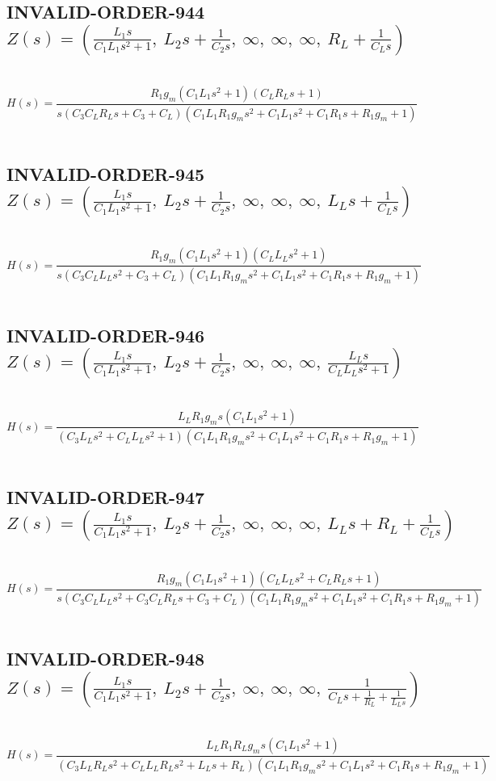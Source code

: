 \documentclass{article}
\begin{document}
\subsection{INVALID-ORDER-944 $Z(s) = \left( \frac{L_{1} s}{C_{1} L_{1} s^{2} + 1}, \  L_{2} s + \frac{1}{C_{2} s}, \  \infty, \  \infty, \  \infty, \  R_{L} + \frac{1}{C_{L} s}\right)$ } \ 
\textbf{\[H(s) = \frac{R_{1} g_{m} \left(C_{1} L_{1} s^{2} + 1\right) \left(C_{L} R_{L} s + 1\right)}{s \left(C_{3} C_{L} R_{L} s + C_{3} + C_{L}\right) \left(C_{1} L_{1} R_{1} g_{m} s^{2} + C_{1} L_{1} s^{2} + C_{1} R_{1} s + R_{1} g_{m} + 1\right)}\] } \ 
\subsection{INVALID-ORDER-945 $Z(s) = \left( \frac{L_{1} s}{C_{1} L_{1} s^{2} + 1}, \  L_{2} s + \frac{1}{C_{2} s}, \  \infty, \  \infty, \  \infty, \  L_{L} s + \frac{1}{C_{L} s}\right)$ } \ 
\textbf{\[H(s) = \frac{R_{1} g_{m} \left(C_{1} L_{1} s^{2} + 1\right) \left(C_{L} L_{L} s^{2} + 1\right)}{s \left(C_{3} C_{L} L_{L} s^{2} + C_{3} + C_{L}\right) \left(C_{1} L_{1} R_{1} g_{m} s^{2} + C_{1} L_{1} s^{2} + C_{1} R_{1} s + R_{1} g_{m} + 1\right)}\] } \ 
\subsection{INVALID-ORDER-946 $Z(s) = \left( \frac{L_{1} s}{C_{1} L_{1} s^{2} + 1}, \  L_{2} s + \frac{1}{C_{2} s}, \  \infty, \  \infty, \  \infty, \  \frac{L_{L} s}{C_{L} L_{L} s^{2} + 1}\right)$ } \ 
\textbf{\[H(s) = \frac{L_{L} R_{1} g_{m} s \left(C_{1} L_{1} s^{2} + 1\right)}{\left(C_{3} L_{L} s^{2} + C_{L} L_{L} s^{2} + 1\right) \left(C_{1} L_{1} R_{1} g_{m} s^{2} + C_{1} L_{1} s^{2} + C_{1} R_{1} s + R_{1} g_{m} + 1\right)}\] } \ 
\subsection{INVALID-ORDER-947 $Z(s) = \left( \frac{L_{1} s}{C_{1} L_{1} s^{2} + 1}, \  L_{2} s + \frac{1}{C_{2} s}, \  \infty, \  \infty, \  \infty, \  L_{L} s + R_{L} + \frac{1}{C_{L} s}\right)$ } \ 
\textbf{\[H(s) = \frac{R_{1} g_{m} \left(C_{1} L_{1} s^{2} + 1\right) \left(C_{L} L_{L} s^{2} + C_{L} R_{L} s + 1\right)}{s \left(C_{3} C_{L} L_{L} s^{2} + C_{3} C_{L} R_{L} s + C_{3} + C_{L}\right) \left(C_{1} L_{1} R_{1} g_{m} s^{2} + C_{1} L_{1} s^{2} + C_{1} R_{1} s + R_{1} g_{m} + 1\right)}\] } \ 
\subsection{INVALID-ORDER-948 $Z(s) = \left( \frac{L_{1} s}{C_{1} L_{1} s^{2} + 1}, \  L_{2} s + \frac{1}{C_{2} s}, \  \infty, \  \infty, \  \infty, \  \frac{1}{C_{L} s + \frac{1}{R_{L}} + \frac{1}{L_{L} s}}\right)$ } \ 
\textbf{\[H(s) = \frac{L_{L} R_{1} R_{L} g_{m} s \left(C_{1} L_{1} s^{2} + 1\right)}{\left(C_{3} L_{L} R_{L} s^{2} + C_{L} L_{L} R_{L} s^{2} + L_{L} s + R_{L}\right) \left(C_{1} L_{1} R_{1} g_{m} s^{2} + C_{1} L_{1} s^{2} + C_{1} R_{1} s + R_{1} g_{m} + 1\right)}\] } \ 
\end{document}
